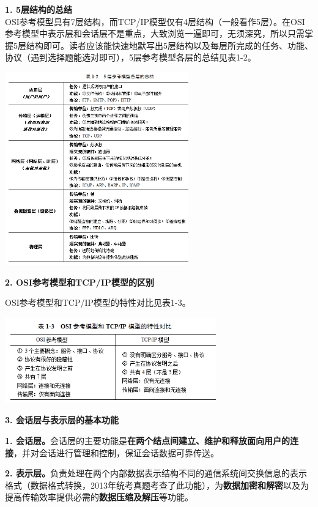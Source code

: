 \textbf{{1. 5层结构的总结}}\\

OSI参考模型具有7层结构，而TCP/IP模型仅有4层结构（一般看作5层）。在OSI参考模型中表示层和会话层不是重点，大致浏览一遍即可，无须深究，所以只需掌握5层结构即可。读者应该能快速地默写出5层结构以及每层所完成的任务、功能、协议（遇到选择题能选对即可），5层参考模型各层的总结见表1-2。

\includegraphics[width=3.12500in,height=3.28125in]{png-jpeg-pics/08D51F6D075F7F6763E3DA40367DB770.png}

\textbf{{2. OSI参考模型和TCP/IP模型的区别}}

{OSI参考模型和TCP/IP模型的特性对比见表1-3。}

\includegraphics[width=3.59375in,height=1.45833in]{png-jpeg-pics/06F9DE75F91B172E6F21374CC3818251.png}

{\textbf{3. 会话层与表示层的基本功能}}

\textbf{{1.
会话层。}}{{会话层的主要功能是}\textbf{{在两个结点间建立、维护和释放面向用户的连接}}{，并对会话进行管理和控制，保证会话数据可靠传送。}}

\textbf{{2.
表示层。}}{{负责处理在两个内部数据表示结构不同的通信系统间交换信息的表示格式（数据格式转换，2013年统考真题考查了此功能），为}\textbf{{数据加密和解密}}{以及为提高传输效率提供必需的}\textbf{{数据压缩及解压}}{等功能。}}
